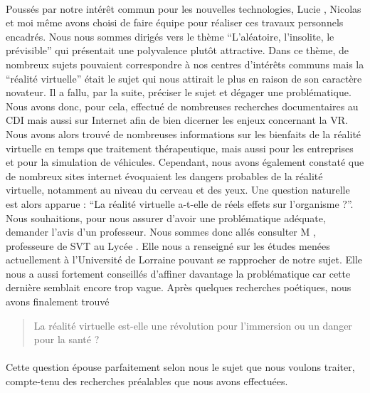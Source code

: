 \documentclass[11pt, a4paper]{article}
\begin{document}
\pagestyle{empty}



\bigskip

\paragraph*{}
Poussés par notre intérêt commun pour les nouvelles technologies, Lucie , Nicolas  et moi même avons choisi de faire équipe pour réaliser ces travaux personnels encadrés. Nous nous sommes dirigés vers le thème ``L'aléatoire, l'insolite, le prévisible'' qui présentait une polyvalence plutôt attractive. Dans ce thème, de nombreux sujets pouvaient correspondre à nos centres d'intérêts communs mais la ``réalité virtuelle'' était le sujet qui nous attirait le plus en raison de son caractère novateur. Il a fallu, par la suite, préciser le sujet et dégager une problématique. Nous avons donc, pour cela, effectué de nombreuses recherches documentaires au CDI mais aussi sur Internet afin de bien dicerner les enjeux concernant la VR. Nous avons alors trouvé de nombreuses informations sur les bienfaits de la réalité virtuelle en temps que traitement thérapeutique, mais aussi pour les entreprises et pour la simulation de véhicules. Cependant, nous avons également constaté que de nombreux sites internet évoquaient les dangers probables de la réalité  virtuelle, notamment au niveau du cerveau et des yeux. Une question naturelle est alors apparue : ``La réalité virtuelle a-t-elle de réels effets sur l'organisme ?''.
Nous souhaitions, pour nous assurer d'avoir une problématique adéquate, demander l'avis d'un professeur. Nous sommes donc allés consulter M , professeure de SVT au Lycée . Elle nous a renseigné sur les études menées actuellement à l'Université de Lorraine pouvant se rapprocher de notre sujet. Elle nous a aussi fortement conseillés d'affiner davantage la problématique car cette dernière semblait encore trop vague.
Après quelques recherches poétiques, nous avons finalement trouvé
\begin{quote}
La réalité virtuelle est-elle une révolution pour l'immersion ou un danger pour la santé ?
\end{quote}

\paragraph*{}
Cette question épouse parfaitement selon nous le sujet que nous voulons traiter, compte-tenu des recherches préalables que nous avons effectuées.
\end{document}
